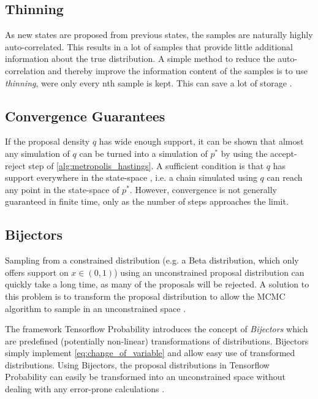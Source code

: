 \subsection{Thinning}
As new states are proposed from previous states, the samples are naturally highly auto-correlated. This results in a lot of samples that provide little additional information about the true distribution. A simple method to reduce the auto-correlation and thereby improve the information content of the samples is to use \textit{thinning}, were only every nth sample is kept. This can save a lot of storage \cite{murphy}.

\subsection{Convergence Guarantees}
If the proposal density $q$ has wide enough support, it can be shown that almost any simulation of $q$ can be turned into a simulation of $p^*$ by using the accept-reject step of \cref{alg:metropolis_hastings}. A sufficient condition is that $q$ has support everywhere in the state-space \cite{robert2016metropolishastings}, i.e. a chain simulated using $q$ can reach any point in the state-space of $p^*$. However, convergence is not generally guaranteed in finite time, only as the number of steps approaches the limit. 

\subsection{Bijectors}
Sampling from a constrained distribution (e.g. a Beta distribution, which only offers support on $x \in (0, 1)$) using an unconstrained proposal distribution can quickly take a long time, as many of the proposals will be rejected. A solution to this problem is to transform the proposal distribution to allow the MCMC algorithm to sample in an unconstrained space \cite{Parno_2018, tensorflow2015-whitepaper}. 

The framework Tensorflow Probability introduces the concept of \textit{Bijectors} which are predefined (potentially non-linear) transformations of distributions. Bijectors simply implement \cref{eq:change_of_variable} and allow easy use of transformed distributions. Using Bijectors, the proposal distributions in Tensorflow Probability can easily be transformed into an unconstrained space without dealing with any error-prone calculations \cite{tensorflow2015-whitepaper}. 


